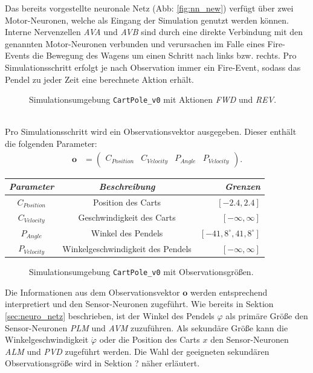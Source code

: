 	Das bereits vorgestellte neuronale Netz (Abb: \ref{fig:nn_new}) verfügt über zwei Motor-Neuronen, welche als Eingang der Simulation genutzt werden können. Interne Nervenzellen \textit{AVA} und \textit{AVB} sind durch eine direkte Verbindung mit den genannten Motor-Neuronen verbunden und verursachen im Falle eines Fire-Events die Bewegung des Wagens um einen Schritt nach links bzw. rechts. Pro Simulationsschritt erfolgt je nach Observation immer ein Fire-Event, sodass das Pendel zu jeder Zeit eine berechnete Aktion erhält.
	\begin{figure}[!h] %
		\centering
		\def\svgwidth{12cm}
		
		\caption{Simulationsumgebung \texttt{CartPole\_v0} mit Aktionen \textit{FWD} und \textit{REV}.}
		\label{fig:imp_cartpole_FWD_REV}
	\end{figure}\\
	Pro Simulationsschritt wird ein Observationsvektor ausgegeben. Dieser enthält die folgenden Parameter:
	\begin{align}
		\boldsymbol{o} &= \begin{pmatrix}C_{Position} & C_{Velocity} & P_{Angle} & P_{Velocity}\end{pmatrix}\text{.}
	\end{align}
	\begin{center}
		\begin{tabular}{c@{\hskip 0.5cm}c@{\hskip 0.5cm}r@{\hskip 0.5cm}}    \toprule
			\setlength{\tabcolsep}{50pt}
			\renewcommand{\arraystretch}{1.5}
			\emph{Parameter}	& \emph{Beschreibung}  				& \emph{Grenzen} 			\\\midrule
			$C_{Position}$		& Position des Carts				& $[-2.4, 2.4]$				\\
			$C_{Velocity}$		& Geschwindigkeit des Carts			& $[-\infty, \infty]$		\\
			$P_{Angle}$			& Winkel des Pendels				& $[-41,8^{\circ}, 41,8^{\circ}]$	\\
			$P_{Velocity}$		& Winkelgeschwindigkeit des Pendels	& $[-\infty, \infty]$		\\\bottomrule
			\hline
		\end{tabular}
	\end{center}
	\begin{figure}[!h] %
		\centering
		\def\svgwidth{12cm}
		
		\caption{Simulationsumgebung \texttt{CartPole\_v0} mit Observationsgrößen.}
		\label{fig:imp_cartpole_observation}
	\end{figure}
	Die Informationen aus dem Observationsvektor $\boldsymbol{o}$ werden entsprechend interpretiert und den Sensor-Neuronen zugeführt. Wie bereits in Sektion \ref{sec:neuro_netz} beschrieben, ist der Winkel des Pendels $\varphi$ als primäre Größe den Sensor-Neuronen \textit{PLM} und \textit{AVM} zuzuführen. Als sekundäre Größe kann die Winkelgeschwindigkeit $\dot{\varphi}$ oder die Position des Carts $x$ den Sensor-Neuronen \textit{ALM} und \textit{PVD} zugeführt werden. Die Wahl der geeigneten sekundären Observationsgröße wird in Sektion ? näher erläutert.

